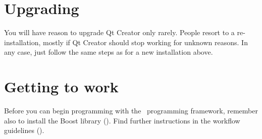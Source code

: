 \FloatBarrier

\section{Upgrading}
You will have reason to upgrade Qt Creator only rarely. People resort to a re-installation, mostly if Qt Creator should stop working for unknown reasons. In any case, just follow the same steps as for a new installation above.

\section{Getting to work}
Before you can begin programming with the \US\ programming framework, remember also to install the Boost library (). Find further instructions in the workflow guidelines ().

